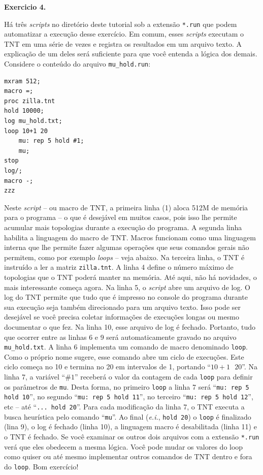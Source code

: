 \begin{refsection}
\begin{blackBlock}{\textbf{Exercicio 4.}}
\end{blackBlock}

Há três \textit{scripts} no diretório deste tutorial sob a extensão \texttt{*.run} que podem automatizar a execução desse exercício. Em comum, esses \textit{scripts} executam o TNT em uma série de vezes e registra os resultados em um arquivo texto. A explicação de um deles será suficiente para que você entenda a lógica dos demais. Considere o conteúdo do arquivo \texttt{mu\_hold.run}:

\begin{lstlisting}[label=tut4:tnt_macro]
mxram 512;
macro =;
proc zilla.tnt
hold 10000;
log mu_hold.txt;
loop 10+1 20
    mu: rep 5 hold #1;
    mu;
stop
log/;
macro -;
zzz
\end{lstlisting}


Neste \textit{script} -- ou macro de TNT, a primeira linha (1) aloca 512M de memória para o programa -- o que é desejável em muitos casos, pois isso lhe permite acumular mais topologias durante a execução do programa. A segunda linha habilita a linguagem do macro de TNT. Macros funcionam como uma linguagem interna que lhe permite fazer algumas operações que seus comandos gerais não permitem, como por exemplo \textit{loops} -- veja abaixo. Na terceira linha, o TNT é instruído a ler a matriz \texttt{zilla.tnt}. A linha 4 define o número máximo de topologias que o TNT poderá manter na memória. Até aqui, não há novidades, o mais interessante começa agora. Na linha 5, o \textit{script} abre um arquivo de log. O log do TNT permite que tudo que é impresso no console do programa durante sua execução seja também direcionado para um arquivo texto. Isso pode ser desejável se você precisa coletar informações de execuções longas ou mesmo documentar o que fez. Na linha 10, esse arquivo de log é fechado. Portanto, tudo que ocorrer entre as linhas 6 e 9 será automaticamente gravado no arquivo \texttt{mu\_hold.txt}. A linha 6 implementa um comando de macro denominado \texttt{loop}. Como o próprio nome sugere, esse comando abre um ciclo de execuções. Este ciclo começa no 10 e termina no 20 em intervalos de 1, portando ``$10+1~~~20$''. Na linha 7, a variável ``$\#1$'' receberá o valor da contagem de cada \texttt{loop} para definir os parâmetros de \texttt{mu}. Desta forma, no primeiro \texttt{loop} a linha 7 será ``\texttt{mu: rep 5 hold 10}'', no segundo ``\texttt{mu: rep 5 hold 11}'', no terceiro ``\texttt{mu: rep 5 hold 12}'', etc -- até  ``\texttt{... hold 20}''. Para cada modificação da linha 7, o TNT executa a busca heurística pelo comando ``\texttt{mu}''. Ao final (\textit{e.i.}, \texttt{hold 20}) o \texttt{loop} é finalizado (lina 9), o log é fechado (linha 10), a linguagem macro é desabilitada (linha 11) e o TNT é fechado. Se você examinar os outros dois arquivos com a extensão \texttt{*.run} verá que eles obedecem a mesma lógica. Você pode mudar os valores do loop como quiser ou até mesmo implementar outros comandos de TNT dentro e fora do \texttt{loop}. Bom exercício!





\end{refsection}
